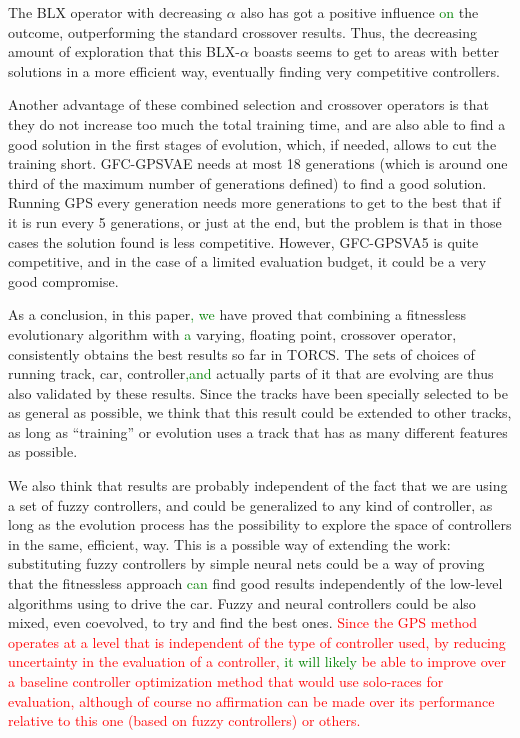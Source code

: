 \documentclass[10pt,journal,compsoc]{IEEEtran}
\begin{document}
The  BLX operator with decreasing $\alpha$ also has got a positive
influence \textcolor{green}{on} the outcome, outperforming the standard crossover
results. Thus, the decreasing amount of exploration that this BLX-$\alpha$ boasts seems to get to areas with better solutions in a
more efficient way, eventually finding very competitive controllers.

Another advantage of these combined selection and crossover operators is that they do not
increase too much the total training time, and are also able to find a
good solution in the first stages of evolution, which, if needed,
allows to cut the training short. {\sf GFC-GPSVAE} needs at most 18
generations (which is around one third of the maximum number of
generations defined) to find a good solution. Running GPS every
generation needs more generations to get to the best that if it is run
every 5 generations, or just at the end, but the problem is that in
those cases the solution found is less competitive. However, {\sf
  GFC-GPSVA5} is quite competitive, and in the case of a limited
evaluation budget, it could be a very good compromise.

As a conclusion, in this paper\textcolor{green}{, we} have proved that combining a fitnessless evolutionary algorithm with \textcolor{green}{a} varying, floating point,
crossover operator, consistently obtains the best results so far in
TORCS. The sets of choices of running track, car, controller\textcolor{green}{,and} actually parts of it that are evolving are thus also validated by
these results. Since the tracks have been specially selected to be as
general as possible, we think that this result could be extended to
other tracks, as long as ``training'' or evolution uses a track that
has as many different features as possible.

We also think that results are probably independent of the fact that
we are using a set of fuzzy controllers, and could be
generalized to any kind of controller, as long as the evolution
process has the possibility to explore the space of controllers in the
same, efficient, way. This is a possible way of extending the work:
substituting fuzzy controllers by simple neural nets could be a way of
proving that the fitnessless approach \textcolor{green}{can} find good results
independently of the low-level algorithms using to drive the
car. Fuzzy and neural controllers could be also mixed, even coevolved,
to try and find the best ones. \textcolor{red}{Since the GPS method
  operates at a level that is independent of the type of controller used, by
  reducing uncertainty in the evaluation of a controller, \textcolor{green}{it will likely} be able to improve over a baseline controller
  optimization method that would use solo-races for evaluation, although of course no affirmation
  can be made over its performance relative to this one (based on
  fuzzy controllers) or others.}
\end{document}
